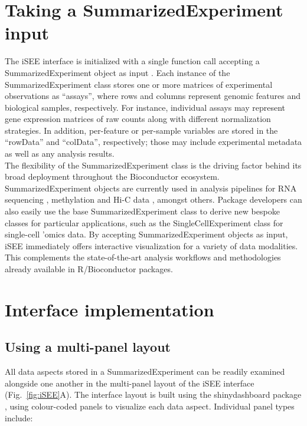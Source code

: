 \documentclass[10pt,a4paper,twocolumn]{article}
\begin{document}
\section*{Taking a SummarizedExperiment input}
The iSEE interface is initialized with a single function call accepting a SummarizedExperiment object as input \citep{huber2015orchestrating}.
Each instance of the SummarizedExperiment class stores one or more matrices of experimental observations as ``assays'', where rows and columns represent genomic features and biological samples, respectively.
For instance, individual assays may represent gene expression matrices of raw counts along with different normalization strategies.
In addition, per-feature or per-sample variables are stored in the ``rowData'' and ``colData'', respectively; those may include experimental metadata as well as any analysis results.\\

The flexibility of the SummarizedExperiment class is the driving factor behind its broad deployment throughout the Bioconductor ecosystem.
SummarizedExperiment objects are currently used in analysis pipelines for RNA sequencing \citep{love2014moderated}, methylation \citep{aryee2014minfi} and Hi-C data \citep{lun2016infrastructure}, amongst others.
Package developers can also easily use the base SummarizedExperiment class to derive new bespoke classes for particular applications, such as the SingleCellExperiment class for single-cell 'omics data.
By accepting SummarizedExperiment objects as input, iSEE immediately offers interactive visualization for a variety of data modalities.
This complements the state-of-the-art analysis workflows and methodologies already available in R/Bioconductor packages. \\

\section*{Interface implementation}

\subsection*{Using a multi-panel layout}
All data aspects stored in a SummarizedExperiment can be readily examined alongside one another in the multi-panel layout of the iSEE interface (Fig.~\ref{fig:iSEE}A).
The interface layout is built using the shinydashboard package \citep{chang2018shinydashboard}, using colour-coded panels to visualize each data aspect.
Individual panel types include:
\end{document}
